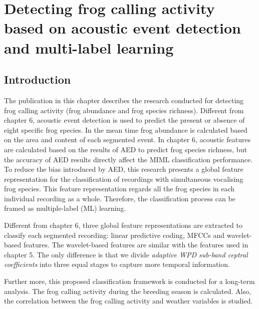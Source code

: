 
\chapter{Detecting frog calling activity based on acoustic event detection and multi-label learning}
\label{cha:cha7ML}


\section{Introduction}
\label{sect:introduction}

The publication in this chapter describes the research conducted for detecting frog calling activity (frog abundance and frog species richness). Different from chapter 6, acoustic event detection is used to predict the present or absence of eight specific frog species. In the mean time frog abundance is calculated based on the area and content of each segmented event.
In chapter 6, acoustic features are calculated based on the results of AED to predict frog species richness, but the accuracy of AED results directly affect the MIML classification performance.
To reduce the bias introduced by AED, this research presents a global feature representation for the classification of recordings with simultaneous vocalising frog species. This feature representation regards all the frog species in each individual recording as a whole. Therefore, the classification process can be framed as multiple-label (ML) learning.  



Different from chapter 6, three global feature representations are extracted to classify each segmented recording: linear predictive coding, MFCCs and wavelet-based features. The wavelet-based features are similar with the features used in chapter 5. The only difference is that we divide \textit{adaptive WPD sub-band ceptral coefficients} into three equal stages to capture more temporal information.


 
Further more, this proposed classification framework is conducted for a long-term analysis. The frog calling activity during the breeding season is calculated. Also, the correlation between the frog calling activity and weather variables is studied. 

  



